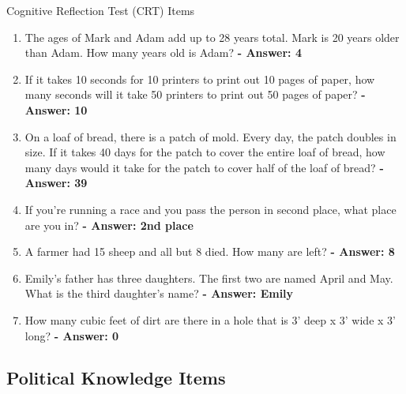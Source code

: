 \documentclass[10pt,table]{beamer}
\begin{document}
\begin{frame}[t, fragile, label = crt_wording]{Cognitive Reflection Test (CRT) Items}

\setlength{\leftmargini}{15pt}
\setlength{\rightmargini}{20pt}
\vspace{0.5em} \small


 \small
        \begin{enumerate}
        \item The ages of Mark and Adam add up to 28 years total. Mark is 20 years older than Adam. How many years old is Adam? \textbf{- Answer: 4}
        \item If it takes 10 seconds for 10 printers to print out 10 pages of paper, how many seconds will it take 50 printers to print out 50 pages of paper? \textbf{- Answer: 10}
        \item On a loaf of bread, there is a patch of mold. Every day, the patch doubles in size. If it takes 40 days for the patch to cover the entire loaf of bread, how many days would it take for the patch to cover half of the loaf of bread? \textbf{- Answer: 39}
        \item If you’re running a race and you pass the person in second place, what place are you in? \textbf{- Answer: 2nd place}
        \item A farmer had 15 sheep and all but 8 died. How many are left? \textbf{- Answer: 8}
        \item Emily’s father has three daughters. The first two are named April and May. What is the third daughter’s name? \textbf{- Answer: Emily}
        \item How many cubic feet of dirt are there in a hole that is 3’ deep x 3’ wide x 3’ long? \textbf{- Answer: 0}

    \end{enumerate}
\vspace{1.5em}

\hspace{-0.75em}\hyperlink{variables<3>}{}\hspace{0.5em}\hyperlink{app}{}

\end{frame}

\subsection{Political Knowledge Items}
\end{document}
